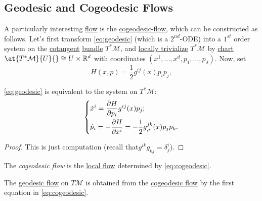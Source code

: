 \subsection{Geodesic and Cogeodesic Flows}
A particularly interesting \hyperref[def:local-flow]{flow} is the \hyperref[def:cogeodesic-flow]{cogeodesic-flow}, which can be constructed as follows. Let's first transform \autoref{eq:geodesic} (which is a \(2^{nd}\)-ODE) into a \(1^{st} \) order system on the \hyperref[def:cotangent-space]{cotangent} \hyperref[def:vector-bundle]{bundle} \(T^{\ast} \mathcal{M} \), and \hyperref[def:local-trivialization]{locally trivialize} \(T^{\ast} \mathcal{M} \) by \hyperref[def:coordinate-chart]{chart} \(\at{T^{\ast} \mathcal{M} }{U}{} \cong U \times \mathbb{R} ^d\) with coordinates \((x^1, \ldots , x^d, p_1, \ldots , p_d)\). Now, set
\begin{equation}\label{eq:Hamilton}
	H(x, p) = \frac{1}{2} g^{ij} (x) p_i p_j,
\end{equation}

\begin{theorem}
	\autoref{eq:geodesic} is equivalent to the system on \(T^{\ast} \mathcal{M} \):
	\begin{equation}\label{eq:cogeodesic}
		\begin{dcases}
			\dot{x}^i = \frac{\partial H}{\partial p_i} g^{ij}(x) p_j; \\
			\dot{p}_i = -\frac{\partial H}{\partial x^i} = -\frac{1}{2} g^{jk}_{, i}(x)p_j p_k.
		\end{dcases}
	\end{equation}
\end{theorem}
\begin{proof}
	This is just computation (recall that\(g^{ik} g_{kj} = \delta ^i_j \)).
\end{proof}

\begin{definition}\label{def:cogeodesic-flow}
	The \emph{cogeodesic flow} is the \hyperref[def:local-flow]{local flow} determined by \autoref{eq:cogeodesic}.
\end{definition}

\begin{definition}\label{def:geodesic-flow}
	The \hyperref[def:geodesic-flow]{geodesic flow} on \(T\mathcal{M} \) is obtained from the \hyperref[def:cogeodesic-flow]{cogeodesic flow} by the first equation in \autoref{eq:cogeodesic}.
\end{definition}

